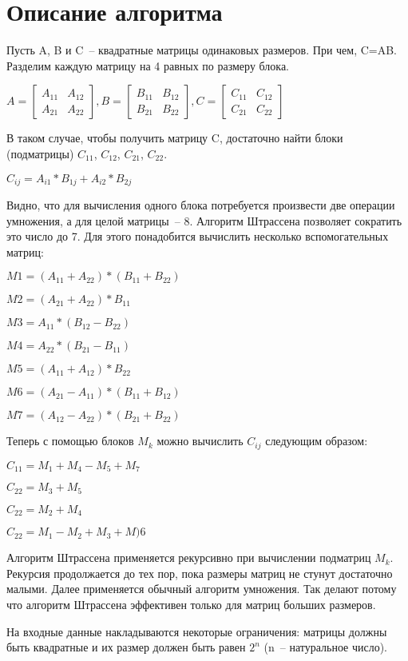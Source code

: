 \documentclass{report}
\begin{document}
\section{Описание алгоритма}
\par Пусть A, B и C~-- квадратные матрицы одинаковых размеров. При чем, C=AB. Разделим каждую матрицу на 4 равных по размеру блока.
\begin{center}
$A=\begin{bmatrix}
A_{11} & A_{12}\\
A_{21} & A_{22}
\end{bmatrix},
B=\begin{bmatrix}
B_{11} & B_{12}\\
B_{21} & B_{22}
\end{bmatrix},
C=\begin{bmatrix}
C_{11} & C_{12}\\
C_{21} & C_{22}
\end{bmatrix}$
\end{center}
\par В таком случае, чтобы получить матрицу C, достаточно найти блоки (подматрицы) $C_{11}$, $C_{12}$, $C_{21}$, $C_{22}$.
\begin{center}
$C_{ij}=A_{i1}*B_{1j}+A_{i2}*B_{2j}$
\par Видно, что для вычисления одного блока потребуется произвести две операции умножения, а для целой матрицы~-- 8. Алгоритм Штрассена позволяет сократить это число до 7. Для этого понадобится вычислить несколько вспомогательных матриц:\\
\begin{minipage}{0.5\textwidth}
$M1=(A_{11} + A_{22})*(B_{11} + B_{22})$

$M2=(A_{21} + A_{22})*B_{11}$

$M3=A_{11}*(B_{12} - B_{22})$

$M4=A_{22}*(B_{21} - B_{11})$

$M5=(A_{11} + A_{12})*B_{22}$

$M6=(A_{21} - A_{11})*(B_{11} + B_{12})$

$M7=(A_{12} - A_{22})*(B_{21} + B_{22})$
\end{minipage}
\par Теперь с помощью блоков $M_k$ можно вычислить $C_{ij}$ следующим образом:
\begin{minipage}{0.5\textwidth}
$C_{11}=M_1+M_4-M_5+M_7$

$C_{22}=M_3+M_5$

$C_{22}=M_2+M_4$

$C_{22}=M_1-M_2+M_3+M)6$
\end{minipage}
\end{center}
\par Алгоритм Штрассена применяется рекурсивно при вычислении подматриц $M_k$. Рекурсия продолжается до тех пор, пока размеры матриц не стунут достаточно малыми. Далее применяется обычный алгоритм умножения. Так делают потому что алгоритм Штрассена эффективен только для матриц больших размеров.
\par На входные данные накладываются некоторые ограничения: матрицы должны быть квадратные и их размер должен быть равен $2^n$ (n~-- натуральное число).
\end{document}
